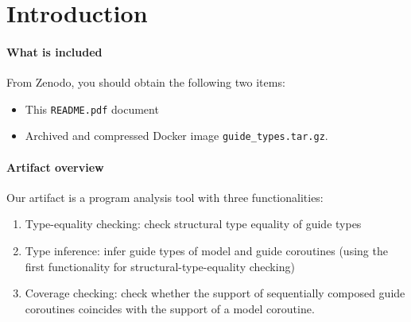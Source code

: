 
\section{Introduction}

\paragraph{What is included}

From Zenodo, you should obtain the following two items:
\begin{itemize}
  \item This \texttt{README.pdf} document
  \item Archived and compressed Docker image \texttt{guide\_types.tar.gz}.
\end{itemize}

\paragraph{Artifact overview}

Our artifact is a program analysis tool with three functionalities:
\begin{enumerate}[label=(F\arabic*), ref=F\arabic*]
  \item Type-equality checking: check structural type equality of guide types
        \label{functionality:type-equality checking}
  \item Type inference: infer guide types of model and guide coroutines (using
        the first functionality for structural-type-equality checking)
        \label{functionality:type inference}
  \item Coverage checking: check whether the support of sequentially composed
        guide coroutines coincides with the support of a model coroutine.
        \label{functionality: coverage checking}
\end{enumerate}

